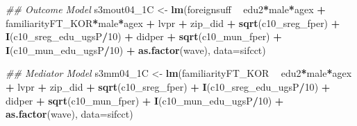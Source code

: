 \documentclass[
]{article}
\newenvironment{Shaded}{\begin{snugshade}}{\end{snugshade}}
\newcommand{\CommentTok}[1]{\textcolor[rgb]{0.56,0.35,0.01}{\textit{#1}}}
\newcommand{\DataTypeTok}[1]{\textcolor[rgb]{0.13,0.29,0.53}{#1}}
\newcommand{\DecValTok}[1]{\textcolor[rgb]{0.00,0.00,0.81}{#1}}
\newcommand{\KeywordTok}[1]{\textcolor[rgb]{0.13,0.29,0.53}{\textbf{#1}}}
\newcommand{\NormalTok}[1]{#1}
\newcommand{\OperatorTok}[1]{\textcolor[rgb]{0.81,0.36,0.00}{\textbf{#1}}}
\newcommand{\StringTok}[1]{\textcolor[rgb]{0.31,0.60,0.02}{#1}}
\begin{document}
\begin{Shaded}
\begin{Highlighting}[]
\CommentTok{## Outcome Model }
\NormalTok{s3mout04_1C <-}\StringTok{ }\KeywordTok{lm}\NormalTok{(foreignsuff  }\OperatorTok{~}\StringTok{ }\NormalTok{edu2}\OperatorTok{*}\NormalTok{male}\OperatorTok{*}\NormalTok{agex }\OperatorTok{+}\StringTok{ }\NormalTok{familiarityFT_KOR}\OperatorTok{*}\NormalTok{male}\OperatorTok{*}\NormalTok{agex }\OperatorTok{+}\StringTok{ }\NormalTok{lvpr }\OperatorTok{+}\StringTok{  }
\StringTok{                    }\NormalTok{zip_did }\OperatorTok{+}\StringTok{ }\KeywordTok{sqrt}\NormalTok{(c10_sreg_fper) }\OperatorTok{+}\StringTok{ }\KeywordTok{I}\NormalTok{(c10_sreg_edu_ugsP}\OperatorTok{/}\DecValTok{10}\NormalTok{) }\OperatorTok{+}\StringTok{ }
\StringTok{                    }\NormalTok{didper }\OperatorTok{+}\StringTok{ }\KeywordTok{sqrt}\NormalTok{(c10_mun_fper) }\OperatorTok{+}\StringTok{ }\KeywordTok{I}\NormalTok{(c10_mun_edu_ugsP}\OperatorTok{/}\DecValTok{10}\NormalTok{) }\OperatorTok{+}\StringTok{ }
\StringTok{                    }\KeywordTok{as.factor}\NormalTok{(wave), }\DataTypeTok{data=}\NormalTok{sifcct)}

\CommentTok{## Mediator Model}
\NormalTok{s3mm04_1C <-}\StringTok{ }\KeywordTok{lm}\NormalTok{(familiarityFT_KOR  }\OperatorTok{~}\StringTok{ }\NormalTok{edu2}\OperatorTok{*}\NormalTok{male}\OperatorTok{*}\NormalTok{agex }\OperatorTok{+}\StringTok{ }\NormalTok{lvpr }\OperatorTok{+}\StringTok{  }
\StringTok{                  }\NormalTok{zip_did }\OperatorTok{+}\StringTok{ }\KeywordTok{sqrt}\NormalTok{(c10_sreg_fper) }\OperatorTok{+}\StringTok{ }\KeywordTok{I}\NormalTok{(c10_sreg_edu_ugsP}\OperatorTok{/}\DecValTok{10}\NormalTok{) }\OperatorTok{+}\StringTok{ }
\StringTok{                  }\NormalTok{didper }\OperatorTok{+}\StringTok{ }\KeywordTok{sqrt}\NormalTok{(c10_mun_fper) }\OperatorTok{+}\StringTok{ }\KeywordTok{I}\NormalTok{(c10_mun_edu_ugsP}\OperatorTok{/}\DecValTok{10}\NormalTok{) }\OperatorTok{+}\StringTok{ }
\StringTok{                  }\KeywordTok{as.factor}\NormalTok{(wave), }\DataTypeTok{data=}\NormalTok{sifcct)}


\end{Highlighting}
\end{Shaded}
\end{document}
